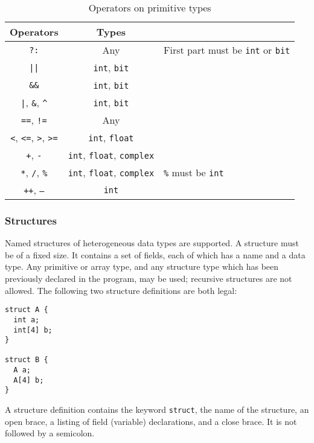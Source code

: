 \documentclass[11pt]{article}
\begin{document}
\begin{table}
\begin{center}
\begin{tabular}{ccl}
\toprule
\textbf{Operators} & \textbf{Types} \\
\midrule
\texttt{?:} & Any & First part must be \texttt{int} or \texttt{bit} \\
\texttt{||} & \texttt{int}, \texttt{bit} \\
\texttt{\&\&} & \texttt{int}, \texttt{bit} \\
\texttt{|}, \texttt{\&}, \texttt{\^} &
  \texttt{int}, \texttt{bit} \\
\texttt{==}, \texttt{!=} & Any \\
\texttt{<}, \texttt{<=}, \texttt{>}, \texttt{>=} &
  \texttt{int}, \texttt{float} \\
\texttt{+}, \texttt{-} &
  \texttt{int}, \texttt{float}, \texttt{complex} \\
\texttt{*}, \texttt{/}, \texttt{\%} &
  \texttt{int}, \texttt{float}, \texttt{complex} &
  \texttt{\%} must be \texttt{int} \\
\texttt{++}, \texttt{--} & \texttt{int} \\
\bottomrule
\end{tabular}
\end{center}
\caption{Operators on primitive types}
\label{tab:primitive-operators}
\end{table}

\subsubsection{Structures}
\label{sec:data-structures}

Named structures of heterogeneous data types are supported.  A
structure must be of a fixed size.  It contains a set of fields, each
of which has a name and a data type.  Any primitive or array type, and
any structure type which has been previously declared in the program,
may be used; recursive structures are not allowed.  The following two
structure definitions are both legal:

\begin{verbatim}
struct A {
  int a;
  int[4] b;
}

struct B {
  A a;
  A[4] b;
}
\end{verbatim}

A structure definition contains the keyword \texttt{struct}, the name
of the structure, an open brace, a listing of field (variable)
declarations, and a close brace.  It is not followed by a semicolon.
\end{document}
